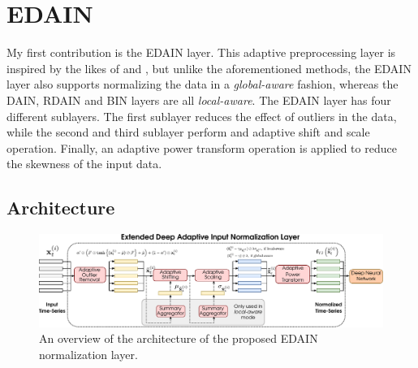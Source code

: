 \documentclass{statsmsc}
\begin{document}
{%

\section{EDAIN}%
\label{sec:EDAIN-method}



My first contribution is the \ac{EDAIN} layer. This adaptive preprocessing layer is inspired
by the likes of \citep{dain}  and \citep{bin}, but unlike the aforementioned methods, the
\ac{EDAIN} layer also supports normalizing the data in a \textit{global-aware} fashion, whereas
the \ac{DAIN}, \ac{RDAIN} and \ac{BIN} layers are all \textit{local-aware}.
The \ac{EDAIN} layer has four different sublayers. The first sublayer reduces the effect of
outliers in the data, while the second and third sublayer perform and adaptive shift and
scale operation. Finally, an adaptive power transform operation is applied to reduce the
skewness of the input data.

\subsection{Architecture}%
\label{sub:Architecture}

\begin{figure}
\begin{center}
    \includegraphics[width=\textwidth]{diagrams/edain-diagram.pdf}
\end{center}
\caption{An overview of the architecture of the proposed \ac{EDAIN} normalization layer.}
\label{fig:edain-arch}
\end{figure}

}
\end{document}
